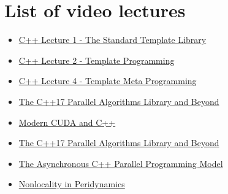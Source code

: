 \documentclass[11pt,fleqn]{book} %
\begin{document}

\chapter*{List of video lectures}


\begin{itemize}
\item \href{https://www.youtube.com/watch?v=asGZTCR53KY&list=PL7vEgTL3FalY2eBxud1wsfz8OKvE9sd_z}{C++ Lecture 1 - The Standard Template Library}
\item \href{https://www.youtube.com/watch?v=iU3wsiJ5mts}{C++ Lecture 2 - Template Programming }
\item \href{https://www.youtube.com/watch?v=6PWUByLZO0g}{C++ Lecture 4 - Template Meta Programming}
\item \href{https://www.youtube.com/watch?v=Vck6kzWjY88}{The C++17 Parallel Algorithms Library and
Beyond}
\item \href{https://youtu.be/5vr7ItjyIH8}{Modern CUDA and C++}
\item \href{https://www.youtube.com/watch?v=Vck6kzWjY88}{The C++17 Parallel Algorithms Library and
Beyond}
\item \href{https://www.youtube.com/watch?v=js-e8xAMd1s}{The Asynchronous C++ Parallel Programming Model}
\item \href{https://www.youtube.com/watch?v=_Uv-_K3KTek&t=32s}{Nonlocality in Peridynamics}
\end{itemize}
\end{document}
